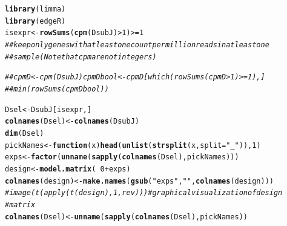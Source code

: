 \documentclass[a4paper]{article}\usepackage[]{graphicx}\usepackage[]{color}
\makeatletter
\newcommand{\hlnum}[1]{\textcolor[rgb]{0.686,0.059,0.569}{#1}}%
\newcommand{\hlstr}[1]{\textcolor[rgb]{0.192,0.494,0.8}{#1}}%
\newcommand{\hlcom}[1]{\textcolor[rgb]{0.678,0.584,0.686}{\textit{#1}}}%
\newcommand{\hlopt}[1]{\textcolor[rgb]{0,0,0}{#1}}%
\newcommand{\hlstd}[1]{\textcolor[rgb]{0.345,0.345,0.345}{#1}}%
\newcommand{\hlkwa}[1]{\textcolor[rgb]{0.161,0.373,0.58}{\textbf{#1}}}%
\newcommand{\hlkwb}[1]{\textcolor[rgb]{0.69,0.353,0.396}{#1}}%
\newcommand{\hlkwc}[1]{\textcolor[rgb]{0.333,0.667,0.333}{#1}}%
\newcommand{\hlkwd}[1]{\textcolor[rgb]{0.737,0.353,0.396}{\textbf{#1}}}%
\newenvironment{kframe}{%
 \def\at@end@of@kframe{}%
 \ifinner\ifhmode%
  \def\at@end@of@kframe{\end{minipage}}%
  \begin{minipage}{\columnwidth}%
 \fi\fi%
 \def\FrameCommand##1{\hskip\@totalleftmargin \hskip-\fboxsep
 \colorbox{shadecolor}{##1}\hskip-\fboxsep
     \hskip-\linewidth \hskip-\@totalleftmargin \hskip\columnwidth}%
 \MakeFramed {\advance\hsize-\width
   \@totalleftmargin\z@ \linewidth\hsize
   \@setminipage}}%
 {\par\unskip\endMakeFramed%
 \at@end@of@kframe}
\newenvironment{knitrout}{}{} %
\makeatother
\begin{document}
\begin{knitrout}
\color{fgcolor}\begin{kframe}
\begin{alltt}
\hlkwd{library}\hlstd{(limma)}
\hlkwd{library}\hlstd{(edgeR)}
\hlstd{isexpr} \hlkwb{<-} \hlkwd{rowSums}\hlstd{(}\hlkwd{cpm}\hlstd{(DsubJ)} \hlopt{>} \hlnum{1}\hlstd{)} \hlopt{>=} \hlnum{1}
\hlcom{## keep only genes with at least one count per million reads in at least one}
\hlcom{## sample (Note that cpm are not integers)}

\hlcom{## cpmD <- cpm(DsubJ) cpmDbool <- cpmD[which(rowSums(cpmD>1) >= 1),]}
\hlcom{## min(rowSums(cpmDbool))}

\hlstd{Dsel} \hlkwb{<-} \hlstd{DsubJ[isexpr, ]}
\hlkwd{colnames}\hlstd{(Dsel)} \hlkwb{<-} \hlkwd{colnames}\hlstd{(DsubJ)}
\hlkwd{dim}\hlstd{(Dsel)}
\hlstd{pickNames} \hlkwb{<-} \hlkwa{function}\hlstd{(}\hlkwc{x}\hlstd{)} \hlkwd{head}\hlstd{(}\hlkwd{unlist}\hlstd{(}\hlkwd{strsplit}\hlstd{(x,} \hlkwc{split} \hlstd{=} \hlstr{"_"}\hlstd{)),} \hlnum{1}\hlstd{)}
\hlstd{exps} \hlkwb{<-} \hlkwd{factor}\hlstd{(}\hlkwd{unname}\hlstd{(}\hlkwd{sapply}\hlstd{(}\hlkwd{colnames}\hlstd{(Dsel), pickNames)))}
\hlstd{design} \hlkwb{<-} \hlkwd{model.matrix}\hlstd{(}\hlopt{~}\hlnum{0} \hlopt{+} \hlstd{exps)}
\hlkwd{colnames}\hlstd{(design)} \hlkwb{<-} \hlkwd{make.names}\hlstd{(}\hlkwd{gsub}\hlstd{(}\hlstr{"exps"}\hlstd{,} \hlstr{""}\hlstd{,} \hlkwd{colnames}\hlstd{(design)))}
\hlcom{# image(t(apply(t(design), 1, rev)) ) # graphical visualization of design}
\hlcom{# matrix}
\hlkwd{colnames}\hlstd{(Dsel)} \hlkwb{<-} \hlkwd{unname}\hlstd{(}\hlkwd{sapply}\hlstd{(}\hlkwd{colnames}\hlstd{(Dsel), pickNames))}
\end{alltt}
\end{kframe}
\end{knitrout}
\end{document}
